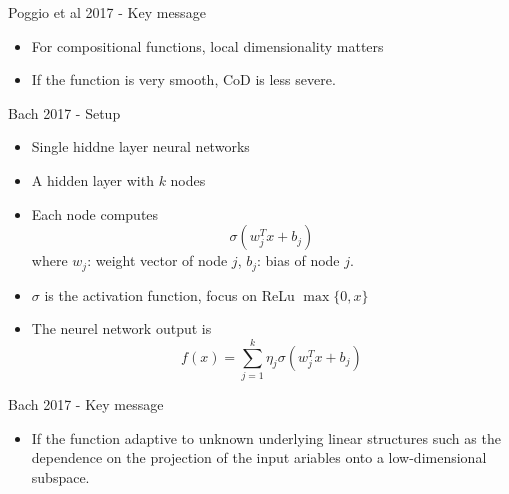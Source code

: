 \documentclass[aspectratio=169]{beamer} %
\begin{document}
\begin{frame}{Poggio et al 2017 - Key message}
\begin{itemize}
    \item For compositional functions, local dimensionality matters
    \item If the function is very smooth, CoD is less severe.
\end{itemize}
    
\end{frame}
\begin{frame}{Bach 2017 - Setup}
\begin{itemize}
    \item Single hiddne layer neural networks
    \item A hidden layer with $k$ nodes
    \item Each node computes
    $$
    \sigma(w_j^Tx+b_j)
    $$
    where $w_j$: weight vector of node $j$, $b_j$: bias of node $j$. 
    \item $\sigma$ is the activation function, focus on ReLu $\max\{0,x\}$
    \item The neurel network output is
    $$
    f(x) = \sum_{j=1}^k\eta_j \sigma(w_j^Tx+b_j)
    $$
\end{itemize}
    
\end{frame}
\begin{frame}{Bach 2017 - Key message}
\begin{itemize}
    \item If the function adaptive to unknown underlying linear structures such as the dependence on the projection of the input ariables onto a low-dimensional subspace. 
\end{itemize}
    
\end{frame}
\end{document}
